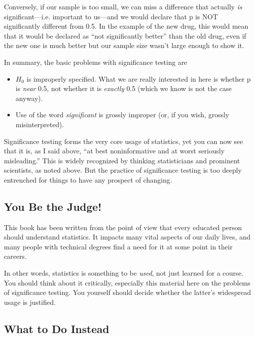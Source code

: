 
Conversely, if our sample is too small, we can miss a difference that
actually {\it is} significant---i.e. important to us---and we would
declare that p is NOT significantly different from 0.5.  In the example
of the new drug, this would mean that it would be declared as ``not
significantly better'' than the old drug, even if the new one is much
better but our sample size wasn't large enough to show it.

In summary, the basic problems with significance testing are

\begin{itemize}

\item $H_0$ is improperly specified.  What we are really interested in
here is whether p is {\it near} 0.5, not whether it is {\it exactly} 0.5
(which we know is not the case anyway).

\item Use of the word {\it significant} is grossly improper (or, if you
wish, grossly misinterpreted).

\end{itemize}

Significance testing forms the very core usage of statistics, yet you
can now see that it is, as I said above, ``at best noninformative and at
worst seriously misleading.'' This is widely recognized by thinking
statisticians and prominent scientists, as noted above.  But the
practice of significance testing is too deeply entrenched for things to
have any prospect of changing.

\subsection{You Be the Judge!}

This book has been written from the point of view that every educated
person should understand statistics.  It impacts many vital aspects of
our daily lives, and many people with technical degrees find a need for
it at some point in their careers.  

In other words, statistics is something to be {\it used}, not just
learned for a course.  You should think about it critically, especially
this material here on the problems of significance testing.  You
yourself should decide whether the latter's widespread usage is
justified.

\subsection{What to Do Instead}


